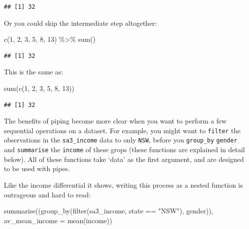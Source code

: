 \documentclass[
]{book}
\newenvironment{Shaded}{\begin{snugshade}}{\end{snugshade}}
\newcommand{\AttributeTok}[1]{\textcolor[rgb]{0.77,0.63,0.00}{#1}}
\newcommand{\DecValTok}[1]{\textcolor[rgb]{0.00,0.00,0.81}{#1}}
\newcommand{\FunctionTok}[1]{\textcolor[rgb]{0.00,0.00,0.00}{#1}}
\newcommand{\NormalTok}[1]{#1}
\newcommand{\SpecialCharTok}[1]{\textcolor[rgb]{0.00,0.00,0.00}{#1}}
\newcommand{\StringTok}[1]{\textcolor[rgb]{0.31,0.60,0.02}{#1}}
\begin{document}
\begin{verbatim}
## [1] 32
\end{verbatim}

Or you could skip the intermediate step altogether:

\begin{Shaded}
\begin{Highlighting}[]
\FunctionTok{c}\NormalTok{(}\DecValTok{1}\NormalTok{, }\DecValTok{2}\NormalTok{, }\DecValTok{3}\NormalTok{, }\DecValTok{5}\NormalTok{, }\DecValTok{8}\NormalTok{, }\DecValTok{13}\NormalTok{) }\SpecialCharTok{\%\textgreater{}\%} 
  \FunctionTok{sum}\NormalTok{()}
\end{Highlighting}
\end{Shaded}

\begin{verbatim}
## [1] 32
\end{verbatim}

This is the same as:

\begin{Shaded}
\begin{Highlighting}[]
\FunctionTok{sum}\NormalTok{(}\FunctionTok{c}\NormalTok{(}\DecValTok{1}\NormalTok{, }\DecValTok{2}\NormalTok{, }\DecValTok{3}\NormalTok{, }\DecValTok{5}\NormalTok{, }\DecValTok{8}\NormalTok{, }\DecValTok{13}\NormalTok{))}
\end{Highlighting}
\end{Shaded}

\begin{verbatim}
## [1] 32
\end{verbatim}

The benefits of piping become more clear when you want to perform a few sequential operations on a dataset. For example, you might want to \texttt{filter} the observations in the \texttt{sa3\_income} data to only \texttt{NSW}, before you \texttt{group\_by} \texttt{gender} and \texttt{summarise} the \texttt{income} of these grops (these functions are explained in detail below). All of these functions take `data' as the first argument, and are designed to be used with pipes.

Like the income differential it shows, writing this process as a nested function is outrageous and hard to read:

\begin{Shaded}
\begin{Highlighting}[]
\FunctionTok{summarise}\NormalTok{((}\FunctionTok{group\_by}\NormalTok{(}\FunctionTok{filter}\NormalTok{(sa3\_income, state }\SpecialCharTok{==} \StringTok{"NSW"}\NormalTok{), gender)), }\AttributeTok{av\_mean\_income =} \FunctionTok{mean}\NormalTok{(income))}
\end{Highlighting}
\end{Shaded}
\end{document}
